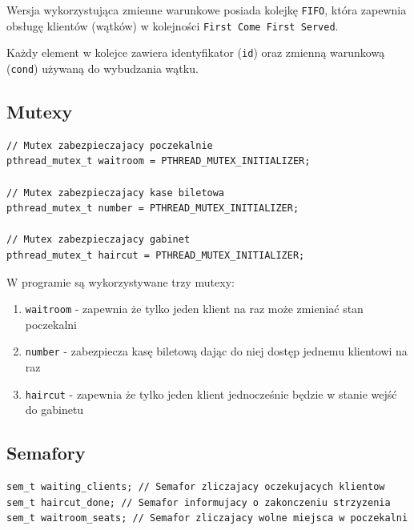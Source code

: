 \documentclass[12pt,a4paper]{article}
\begin{document}
	
	Wersja wykorzystująca zmienne warunkowe posiada kolejkę 
	\texttt{FIFO}, która zapewnia obsługę klientów (wątków) w kolejności 
	\texttt{First Come First Served}.
			
	Każdy element w kolejce zawiera identyfikator (\texttt{id}) oraz
	zmienną warunkową (\texttt{cond}) używaną do wybudzania wątku.
	
	\subsection{Mutexy}
	
	\begin{center}
		\begin{minipage}{0.8\linewidth}
\begin{lstlisting}[caption = Deklaracje mutexów.]
// Mutex zabezpieczajacy poczekalnie
pthread_mutex_t waitroom = PTHREAD_MUTEX_INITIALIZER;

// Mutex zabezpieczajacy kase biletowa
pthread_mutex_t number = PTHREAD_MUTEX_INITIALIZER;

// Mutex zabezpieczajacy gabinet
pthread_mutex_t haircut = PTHREAD_MUTEX_INITIALIZER;
\end{lstlisting}
		\end{minipage}
	\end{center}
	
	W programie są wykorzystywane trzy mutexy:
	\begin{enumerate}
		\item \texttt{waitroom} - zapewnia że tylko jeden klient na raz
			może zmieniać stan poczekalni
		\item \texttt{number} - zabezpiecza kasę biletową dając do niej
			dostęp jednemu klientowi na raz
		\item \texttt{haircut} - zapewnia że tylko jeden klient
			jednocześnie będzie w stanie wejść do gabinetu
	\end{enumerate}
	
	\subsection{Semafory}
	
	\begin{center}
		\begin{minipage}{0.8\linewidth}
\begin{lstlisting}[caption = Deklaracje semaforów.]
sem_t waiting_clients; // Semafor zliczajacy oczekujacych klientow
sem_t haircut_done; // Semafor informujacy o zakonczeniu strzyzenia
sem_t waitroom_seats; // Semafor zliczajacy wolne miejsca w poczekalni
\end{lstlisting}
		\end{minipage}
	\end{center}
	
\end{document}
